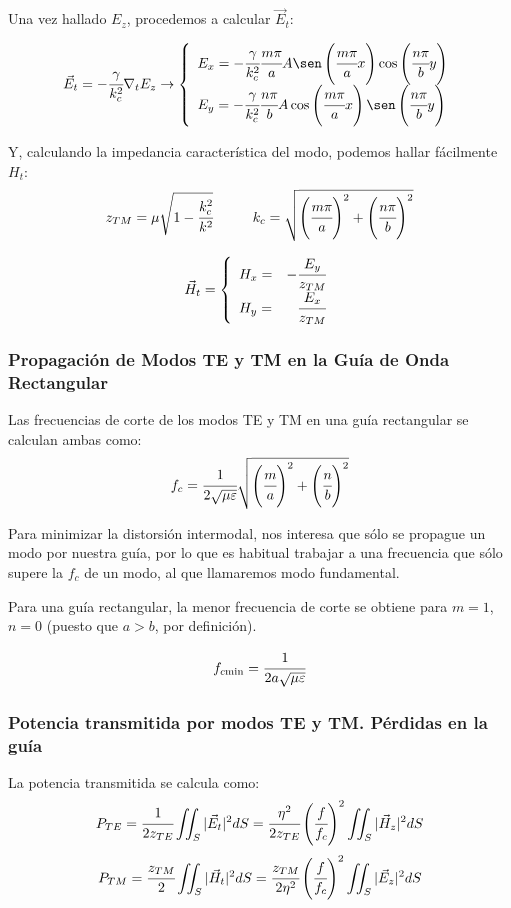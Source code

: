 \documentclass[12pt]{article}
\begin{document}
Una vez hallado $E_z$, procedemos a calcular $\vec{E}_t$:

$$\vec{E}_t = - \cfrac{\gamma}{k^2_c} \nabla_t E_z \rightarrow \left\{ \begin{array}{l}
        E_x = -\cfrac{\gamma}{k^2_c} \cfrac{m\pi}{a} A \sen \left(\cfrac{m\pi}{a}x\right)\cos\left(\cfrac{n\pi}{b}y\right)\\
        E_y = -\cfrac{\gamma}{k^2_c} \cfrac{n\pi}{b} A \cos \left(\cfrac{m\pi}{a}x\right)\sen\left(\cfrac{n\pi}{b}y\right)\end{array} \right. $$
        
Y, calculando la impedancia caracter\'istica del modo, podemos hallar f\'acilmente $H_t$:
$$z_{TM} = \mu\sqrt{1-\cfrac{k^2_c}{k^2}}\hspace{1cm} k_c = \sqrt{\left(\cfrac{m\pi}{a}\right)^2 + \left(\cfrac{n\pi}{b}\right)^2}$$


$$\vec{H}_t =  \left\{ \begin{array}{lr}
        H_x = & -\cfrac{E_y}{z_{TM}}\\
        H_y = & \cfrac{E_x}{z_{TM}}\end{array} \right. $$
        
        
\subsubsection{Propagaci\'on de Modos TE y TM en la Gu\'ia de Onda Rectangular}
Las frecuencias de corte de los modos TE y TM en una gu\'ia rectangular se calculan ambas como:
$$f_{c} = \cfrac{1}{2\sqrt{\mu\varepsilon}}\sqrt{\left(\cfrac{m}{a}\right)^2 + \left(\cfrac{n}{b}\right)^2}$$

Para minimizar la distorsi\'on intermodal, nos interesa que s\'olo se propague un modo por nuestra gu\'ia, por lo que es habitual trabajar a una frecuencia que s\'olo supere la $f_c$ de un modo, al que llamaremos modo fundamental.

Para una gu\'ia rectangular, la menor frecuencia de corte se obtiene para $m=1$, $n=0$ (puesto que $a>b$, por definici\'on).

$$f_{c\text{min}} = \cfrac{1}{2a\sqrt{\mu\varepsilon}}$$

\subsubsection{Potencia transmitida por modos TE y TM. P\'erdidas en la gu\'ia}


La potencia transmitida se calcula como:
$$P_{TE} = \cfrac{1}{2z_{TE}}\iint_S |\vec{E}_t|^2 dS = \cfrac{\eta^2}{2z_{TE}}\left(\cfrac{f}{f_c}\right)^2 \iint_S |\vec{H}_z|^2 dS$$
$$P_{TM} = \cfrac{z_{TM}}{2}\iint_S |\vec{H}_t|^2 dS = \cfrac{z_{TM}}{2\eta^2}\left(\cfrac{f}{f_c}\right)^2 \iint_S |\vec{E}_z|^2 dS$$
\end{document}
